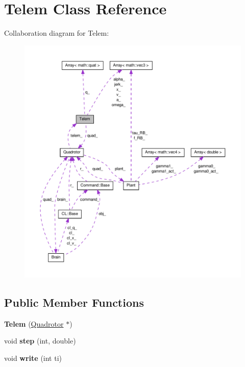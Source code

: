 \hypertarget{classTelem}{\section{\-Telem \-Class \-Reference}
\label{classTelem}
}


\-Collaboration diagram for \-Telem\-:\nopagebreak
\begin{figure}[H]
\begin{center}
\leavevmode
\includegraphics[width=350pt]{classTelem__coll__graph}
\end{center}
\end{figure}
\subsection*{\-Public \-Member \-Functions}
\begin{DoxyCompactItemize}
\item 
\hypertarget{classTelem_adf4c51522fdb2c9e99e4169b0d628f55}{{\bfseries \-Telem} (\hyperlink{classQuadrotor}{\-Quadrotor} $\ast$)}\label{classTelem_adf4c51522fdb2c9e99e4169b0d628f55}

\item 
\hypertarget{classTelem_afaf5327d7f027c91734cbba4a8224569}{void {\bfseries step} (int, double)}\label{classTelem_afaf5327d7f027c91734cbba4a8224569}

\item 
\hypertarget{classTelem_a819ab752690e08d72ea26b8f5eda2995}{void {\bfseries write} (int ti)}\label{classTelem_a819ab752690e08d72ea26b8f5eda2995}

\end{DoxyCompactItemize}
